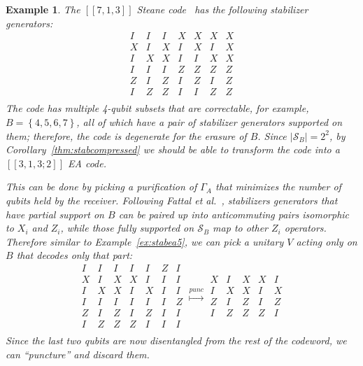 \documentclass[]{amsart}
\newtheorem{example}[theorem]{Example}
\begin{document}
\begin{example}
    The $\left[\!\left[7,1,3\right]\!\right]$ Steane code~\cite{Ste1996} has the following stabilizer generators:
    \begin{equation*}
        \begin{array}{ccccccc}
            I & I & I & X & X & X & X \\
            X & I & X & I & X & I & X \\
            I & X & X & I & I & X & X \\
            I & I & I & Z & Z & Z & Z \\
            Z & I & Z & I & Z & I & Z \\
            I & Z & Z & I & I & Z & Z \\
        \end{array}
    \end{equation*}
    The code has multiple 4-qubit subsets that are correctable, for example, $B=\left\{4,5,6,7\right\}$, all of which have a pair of stabilizer generators supported on them; therefore, the code is degenerate for the erasure of $B$.
    Since $\left\lvert\mathcal{S}_B\right\rvert=2^2$, by Corollary~\ref{thm:stabcompressed} we should be able to transform the code into a $\left[\!\left[3,1,3;2\right]\!\right]$ EA code.
    
    This can be done by picking a purification of $\Gamma_A$ that minimizes the number of qubits held by the receiver.
    Following Fattal et al.~\cite{FCYBC2004}, stabilizers generators that have partial support on $B$ can be paired up into anticommuting pairs isomorphic to $X_i$ and $Z_i$, while those fully supported on $\mathcal{S}_B$ map to other $Z_i$ operators.
    Therefore similar to Example~\ref{ex:stabea5}, we can pick a unitary $V$ acting only on $B$ that decodes only that part:
    \begin{equation*}
        \begin{array}{ccc|cccc}
            I & I & I & I & I & Z & I \\
            X & I & X & X & I & I & I \\
            I & X & X & I & X & I & I \\
            I & I & I & I & I & I & Z \\
            Z & I & Z & I & Z & I & I \\
            I & Z & Z & Z & I & I & I \\
        \end{array}
        \overset{punc}{\longmapsto}
        \begin{array}{ccc|cc}
            X & I & X & X & I \\
            I & X & X & I & X \\
            Z & I & Z & I & Z \\
            I & Z & Z & Z & I \\
        \end{array}
    \end{equation*}
    Since the last two qubits are now disentangled from the rest of the codeword, we can ``puncture'' and discard them.
\end{example}
\end{document}
